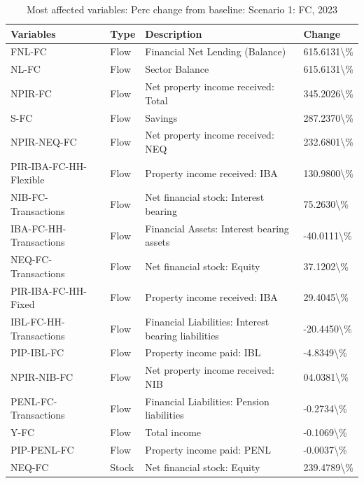 \documentclass[
]{book}
\begin{document}
\begin{table}

\caption{\label{tab:most-affected-scenario-1-perc-2023-FC}Most affected variables: Perc change from baseline: Scenario 1: FC, 2023}
\centering
\fontsize{10}{12}\selectfont
\begin{tabular}[t]{l|l|l|l}
\hline
Variables & Type & Description & Change\\
\hline
FNL-FC & Flow & Financial Net Lending (Balance) & 615.6131\textbackslash{}\%\\
\hline
NL-FC & Flow & Sector Balance & 615.6131\textbackslash{}\%\\
\hline
NPIR-FC & Flow & Net property income received: Total & 345.2026\textbackslash{}\%\\
\hline
S-FC & Flow & Savings & 287.2370\textbackslash{}\%\\
\hline
NPIR-NEQ-FC & Flow & Net property income received: NEQ & 232.6801\textbackslash{}\%\\
\hline
PIR-IBA-FC-HH-Flexible & Flow & Property income received: IBA & 130.9800\textbackslash{}\%\\
\hline
NIB-FC-Transactions & Flow & Net financial stock: Interest bearing & 75.2630\textbackslash{}\%\\
\hline
IBA-FC-HH-Transactions & Flow & Financial Assets: Interest bearing assets & -40.0111\textbackslash{}\%\\
\hline
NEQ-FC-Transactions & Flow & Net financial stock: Equity & 37.1202\textbackslash{}\%\\
\hline
PIR-IBA-FC-HH-Fixed & Flow & Property income received: IBA & 29.4045\textbackslash{}\%\\
\hline
IBL-FC-HH-Transactions & Flow & Financial Liabilities: Interest bearing liabilities & -20.4450\textbackslash{}\%\\
\hline
PIP-IBL-FC & Flow & Property income paid: IBL & -4.8349\textbackslash{}\%\\
\hline
NPIR-NIB-FC & Flow & Net property income received: NIB & 04.0381\textbackslash{}\%\\
\hline
PENL-FC-Transactions & Flow & Financial Liabilities: Pension liabilities & -0.2734\textbackslash{}\%\\
\hline
Y-FC & Flow & Total income & -0.1069\textbackslash{}\%\\
\hline
PIP-PENL-FC & Flow & Property income paid: PENL & -0.0037\textbackslash{}\%\\
\hline
NEQ-FC & Stock & Net financial stock: Equity & 239.4789\textbackslash{}\%\\

\end{tabular}
\end{table}
\end{document}
